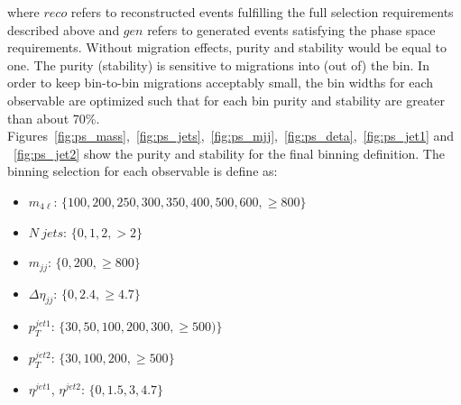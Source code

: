 where $reco$ refers to reconstructed events fulfilling the full selection requirements described above and $gen$ refers to 
generated events satisfying the phase space requirements. 
Without migration effects, purity and stability would be equal to one. The purity
(stability) is sensitive to migrations into (out of) the bin. In order to keep bin-to-bin migrations
acceptably small, the bin widths for each observable are optimized such that for each bin purity
and stability are greater than about 70\%.  Figures~\ref{fig:ps_mass},~\ref{fig:ps_jets},~\ref{fig:ps_mjj},~\ref{fig:ps_deta},~\ref{fig:ps_jet1} and ~\ref{fig:ps_jet2} show the purity and stability for the final binning definition. The binning selection for each observable is define as:\\
\begin{itemize}
\item $m_{4\ell}$: $\{100,200,250,300,350,400,500,600,\ge 800\}$
\item $N\ jets$: $\{0,1,2, >2\}$
\item $m_{jj}$: $\{0,200,\ge 800\}$ 
\item $\Delta\eta_{jj}$: $\{0,2.4,\ge4.7\}$
\item $p_{T}^{jet1}$: $\{30,50,100,200,300,\ge 500)\}$
\item $p_{T}^{jet2}$: $\{30,100,200,\ge 500\}$
\item $\eta^{jet1}$,  $\eta^{jet2}$: $\{0,1.5,3,4.7\}$
\end{itemize}
